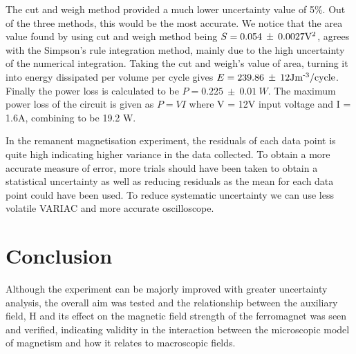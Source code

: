 \documentclass{article}
\begin{document}
The cut and weigh method provided a much lower uncertainty value of 5\%. Out of the three methods,
this would be the most accurate. We notice that the area value found by using cut and weigh
method being $S = 0.054 \: \pm \: 0.0027\text{V\textsuperscript{2}}$, agrees with the Simpson's rule
integration method, mainly due to the high uncertainty of the numerical integration. Taking the cut and 
weigh's value of area, turning it into energy dissipated per volume per cycle gives $E = 239.86 \: \pm
\: 12 \text{Jm\textsuperscript{-3}/cycle}$. Finally the power loss is calculated to be $P = 0.225 \: \pm
\: 0.01 \: W$. The maximum power loss of the circuit is given as $P = VI$ where V = 12V input voltage and I = 1.6A,
combining to be 19.2 W.

In the remanent magnetisation experiment, the residuals of each data point is quite high
indicating higher variance in the data collected. To obtain a more accurate measure of 
error, more trials should have been taken to obtain a statistical uncertainty as well as 
reducing residuals as the mean for each data point could have been used. To reduce systematic 
uncertainty we can use less volatile VARIAC and more accurate oscilloscope.

\section{Conclusion}
Although the experiment can be majorly improved with greater uncertainty analysis, the overall aim was 
tested and the relationship between the auxiliary field, H and its effect on the 
magnetic field strength of the ferromagnet was seen and verified, indicating validity in the 
interaction between the microscopic model of magnetism and how it relates to macroscopic fields.

\appendix
\end{document}
